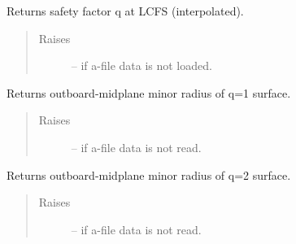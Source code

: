 \documentclass[letterpaper,10pt,english]{sphinxmanual}
\begin{document}
\begin{fulllineitems}

\begin{fulllineitems}
\label{eqtools:eqtools.eqdskreader.EqdskReader.getQLCFS}
Returns safety factor q at LCFS (interpolated).
\begin{quote}\begin{description}
\item[{Raises}] \leavevmode
{} -- if a-file data is not loaded.

\end{description}\end{quote}

\end{fulllineitems}


\begin{fulllineitems}
\label{eqtools:eqtools.eqdskreader.EqdskReader.getQ1Surf}
Returns outboard-midplane minor radius of q=1 surface.
\begin{quote}\begin{description}
\item[{Raises}] \leavevmode
{} -- if a-file data is not read.

\end{description}\end{quote}

\end{fulllineitems}


\begin{fulllineitems}
\label{eqtools:eqtools.eqdskreader.EqdskReader.getQ2Surf}
Returns outboard-midplane minor radius of q=2 surface.
\begin{quote}\begin{description}
\item[{Raises}] \leavevmode
{} -- if a-file data is not read.

\end{description}\end{quote}

\end{fulllineitems}


\end{fulllineitems}
\end{document}
